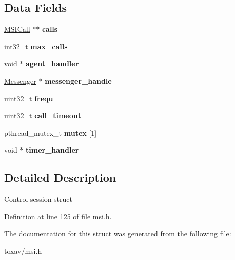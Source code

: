 \subsection*{Data Fields}
\begin{DoxyCompactItemize}
\item 
\hypertarget{struct___m_s_i_session_ac40fee673bae4030b812579c57389a02}{\hyperlink{struct___m_s_i_call}{M\+S\+I\+Call} $\ast$$\ast$ {\bfseries calls}}\label{struct___m_s_i_session_ac40fee673bae4030b812579c57389a02}

\item 
\hypertarget{struct___m_s_i_session_ae4bbb4682dc5c74588083ca06ac2f76f}{int32\+\_\+t {\bfseries max\+\_\+calls}}\label{struct___m_s_i_session_ae4bbb4682dc5c74588083ca06ac2f76f}

\item 
\hypertarget{struct___m_s_i_session_ae284478ea42e8d4ed283876c3ae18c8a}{void $\ast$ {\bfseries agent\+\_\+handler}}\label{struct___m_s_i_session_ae284478ea42e8d4ed283876c3ae18c8a}

\item 
\hypertarget{struct___m_s_i_session_a2adfe301d17504006b8321f71f642039}{\hyperlink{struct_messenger}{Messenger} $\ast$ {\bfseries messenger\+\_\+handle}}\label{struct___m_s_i_session_a2adfe301d17504006b8321f71f642039}

\item 
\hypertarget{struct___m_s_i_session_a54c9341406a254204cca6d48dd54cdc8}{uint32\+\_\+t {\bfseries frequ}}\label{struct___m_s_i_session_a54c9341406a254204cca6d48dd54cdc8}

\item 
\hypertarget{struct___m_s_i_session_a4a61d9413f442d27898849e0d8a26720}{uint32\+\_\+t {\bfseries call\+\_\+timeout}}\label{struct___m_s_i_session_a4a61d9413f442d27898849e0d8a26720}

\item 
\hypertarget{struct___m_s_i_session_ab4293016252c4d4e63549b0773fa0f33}{pthread\+\_\+mutex\+\_\+t {\bfseries mutex} \mbox{[}1\mbox{]}}\label{struct___m_s_i_session_ab4293016252c4d4e63549b0773fa0f33}

\item 
\hypertarget{struct___m_s_i_session_a06ab765308a606d809c4c2a2c71710ce}{void $\ast$ {\bfseries timer\+\_\+handler}}\label{struct___m_s_i_session_a06ab765308a606d809c4c2a2c71710ce}

\end{DoxyCompactItemize}


\subsection{Detailed Description}
Control session struct 

Definition at line 125 of file msi.\+h.



The documentation for this struct was generated from the following file\+:\begin{DoxyCompactItemize}
\item 
toxav/msi.\+h\end{DoxyCompactItemize}

